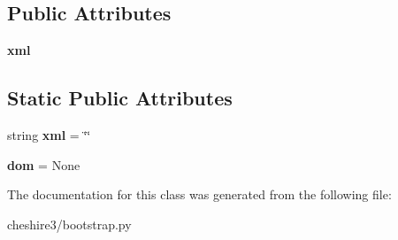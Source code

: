 \subsection*{Public Attributes}
\begin{DoxyCompactItemize}
\item 
\hypertarget{classcheshire3_1_1bootstrap_1_1_bootstrap_record_a8681005cb13a60c77011f03f6f085749}{{\bfseries xml}}\label{classcheshire3_1_1bootstrap_1_1_bootstrap_record_a8681005cb13a60c77011f03f6f085749}

\end{DoxyCompactItemize}
\subsection*{Static Public Attributes}
\begin{DoxyCompactItemize}
\item 
\hypertarget{classcheshire3_1_1bootstrap_1_1_bootstrap_record_a194a0a316128e703d586f52aad4f521a}{string {\bfseries xml} = \char`\"{}\char`\"{}}\label{classcheshire3_1_1bootstrap_1_1_bootstrap_record_a194a0a316128e703d586f52aad4f521a}

\item 
\hypertarget{classcheshire3_1_1bootstrap_1_1_bootstrap_record_abb30b35172a9fe2ecc353785bc715c29}{{\bfseries dom} = None}\label{classcheshire3_1_1bootstrap_1_1_bootstrap_record_abb30b35172a9fe2ecc353785bc715c29}

\end{DoxyCompactItemize}


The documentation for this class was generated from the following file\-:\begin{DoxyCompactItemize}
\item 
cheshire3/bootstrap.\-py\end{DoxyCompactItemize}

